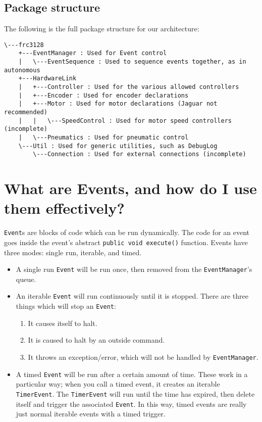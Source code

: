 \documentclass[a4paper]{article}
\begin{document}
\subsection{Package structure}
The following is the full package structure for our architecture:
\begin{verbatim}
\---frc3128
    +---EventManager : Used for Event control
    |   \---EventSequence : Used to sequence events together, as in autonomous
    +---HardwareLink
    |   +---Controller : Used for the various allowed controllers
    |   +---Encoder : Used for encoder declarations
    |   +---Motor : Used for motor declarations (Jaguar not recommended)
    |   |   \---SpeedControl : Used for motor speed controllers (incomplete)
    |   \---Pneumatics : Used for pneumatic control
    \---Util : Used for generic utilities, such as DebugLog
        \---Connection : Used for external connections (incomplete)
\end{verbatim}


\section{What are Events, and how do I use them effectively?}

\lstinline{Event}s are blocks of code which can be run dynamically. The code for an event goes inside the event's abstract \lstinline{public void execute()} function. Events have three modes: single run, iterable, and timed. 
\begin{itemize}
	\item{A single run \lstinline{Event} will be run once, then removed from the \lstinline{EventManager}'s queue.}
	\item{An iterable \lstinline{Event} will run continuously until it is stopped. There are three things which will stop an \lstinline{Event}: \begin{enumerate}
		\item{It causes itself to halt.}
		\item{It is caused to halt by an outside command.}
		\item{It throws an exception/error, which will not be handled by \lstinline{EventManager}.}
		\end{enumerate}
	}
	\item{A timed \lstinline{Event} will be run after a certain amount of time. These work in a particular way; when you call a timed event, it creates an iterable \lstinline{TimerEvent}. The \lstinline{TimerEvent} will run until the time has expired, then delete itself and trigger the associated \lstinline{Event}. In this way, timed events are really just normal iterable events with a timed trigger.}
\end{itemize}
\end{document}
